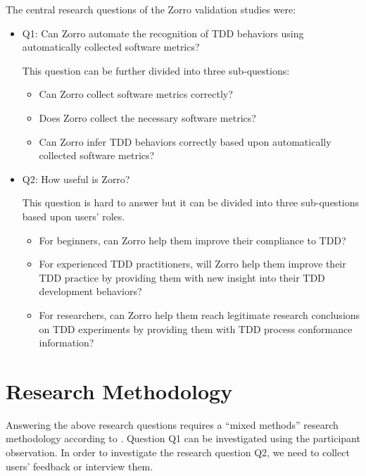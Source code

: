 The central research questions of the Zorro validation studies were:
\begin{itemize}
\item Q1: Can Zorro automate the recognition of TDD behaviors
using automatically collected software metrics?  

This question can be further divided into three sub-questions:
   \begin{itemize}
     \item Can Zorro collect software metrics correctly?
     \item Does Zorro collect the necessary software metrics?
     \item Can Zorro infer TDD behaviors correctly based upon 
     automatically collected software metrics?
   \end{itemize}

\item Q2: How useful is Zorro? 

This question is hard to answer but it can be divided into three sub-questions based upon users' roles.

\begin{itemize}
\item For beginners, can Zorro help them improve their compliance to TDD?
\item For experienced TDD practitioners, will Zorro help them improve their TDD practice by providing them with new insight into their TDD development behaviors?
\item For researchers, can Zorro help them reach legitimate research conclusions on TDD experiments by providing them with TDD process conformance information?
\end{itemize}

\end{itemize}

\section{Research Methodology}
\label{sec:Research-Methods}

Answering the above research questions requires a ``mixed methods'' research methodology according to \cite{Creswell:03}. Question Q1 can be investigated using the participant observation. In order to investigate the research question Q2, we need to collect users' feedback or interview them. 

